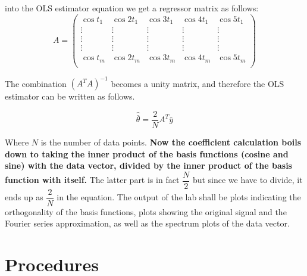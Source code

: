 \documentclass[11pt,letterpaper]{article}
\begin{document}
into the OLS estimator equation we get a regressor matrix as follows:\\
 
\begin{equation}\label{Lab7_FourierSeries5}
A =
\begin{pmatrix}
\cos t_1 & \cos 2 t_1 & \cos 3 t_1 & \cos 4 t_1 & \cos 5 t_1 \\
\vdots &\vdots & \vdots & \vdots & \vdots\\
\vdots &\vdots & \vdots & \vdots & \vdots\\
\vdots &\vdots & \vdots & \vdots & \vdots\\
\cos t_m & \cos 2 t_m & \cos 3 t_m & \cos 4 t_m & \cos 5 t_m \\
\end{pmatrix}
\end{equation}

The combination $(A^T A)^{-1}$ becomes a unity matrix, and therefore the OLS estimator can be written as follows. 

\begin{equation} \label{Lab7_FourierSeries6}
\hat{\bar{\theta}} =  \dfrac{2}{N}  A^T \bar{y}  
\end{equation}

Where $N$ is the number of data points. \textbf{Now the coefficient calculation boils down to taking the inner product of the basis functions (cosine and sine) with the data vector, divided by the inner product of the basis function with itself.} The latter part is in fact $\dfrac{N}{2}$ but since we have to divide, it ends up as $\dfrac{2}{N}$  in the equation. The output of the lab shall be plots indicating the orthogonality of the basis functions, plots showing the original signal and the Fourier series approximation, as well as the spectrum plots of the data vector. 

\section{Procedures}
\end{document}
